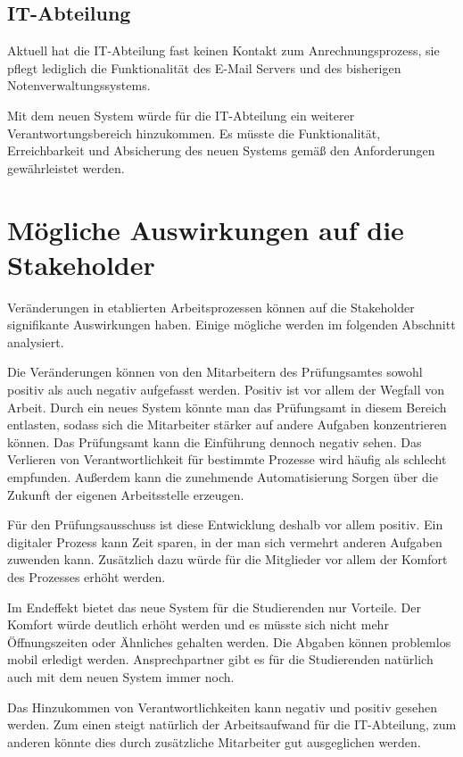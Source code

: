 \documentclass[ngerman]{tudscrreprt}
\begin{document}
\subsection{IT-Abteilung}

Aktuell hat die IT-Abteilung fast keinen Kontakt zum Anrechnungsprozess, sie pflegt lediglich die Funktionalität des E-Mail Servers und des bisherigen Notenverwaltungssystems.

Mit dem neuen System würde für die IT-Abteilung ein weiterer Verantwortungsbereich hinzukommen. Es müsste die Funktionalität, Erreichbarkeit und Absicherung des neuen Systems gemäß den Anforderungen gewährleistet werden.

\section{Mögliche Auswirkungen auf die Stakeholder}

Veränderungen in etablierten Arbeitsprozessen können auf die Stakeholder signifikante Auswirkungen haben. Einige mögliche werden im folgenden Abschnitt analysiert.

Die Veränderungen können von den Mitarbeitern des Prüfungsamtes sowohl positiv als auch negativ aufgefasst werden. Positiv ist vor allem der Wegfall von Arbeit. Durch ein neues System könnte man das Prüfungsamt in diesem Bereich entlasten, sodass sich die Mitarbeiter stärker auf andere Aufgaben konzentrieren können. Das Prüfungsamt kann die Einführung dennoch negativ sehen. Das Verlieren von Verantwortlichkeit für bestimmte Prozesse wird häufig als schlecht empfunden. Außerdem kann die zunehmende Automatisierung Sorgen über die Zukunft der eigenen Arbeitsstelle erzeugen.

Für den Prüfungsausschuss ist diese Entwicklung deshalb vor allem positiv. Ein digitaler Prozess kann Zeit sparen, in der man sich vermehrt anderen Aufgaben zuwenden kann. Zusätzlich dazu würde für die Mitglieder vor allem der Komfort des Prozesses erhöht werden.

Im Endeffekt bietet das neue System für die Studierenden nur Vorteile. Der Komfort würde deutlich erhöht werden und es müsste sich nicht mehr Öffnungszeiten oder Ähnliches gehalten werden. Die Abgaben können problemlos mobil erledigt werden. Ansprechpartner gibt es für die Studierenden natürlich auch mit dem neuen System immer noch.

Das Hinzukommen von Verantwortlichkeiten kann negativ und positiv gesehen werden. Zum einen steigt natürlich der Arbeitsaufwand für die IT-Abteilung, zum anderen könnte dies durch zusätzliche Mitarbeiter gut ausgeglichen werden.
\end{document}
